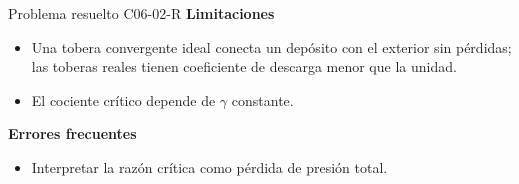 \documentclass[10pt,openany]{book}
\begin{document}
\begin{studiumworked}{Problema resuelto C06-02-R}
\noindent\textbf{Limitaciones}
\begin{itemize}
\item Una tobera convergente ideal conecta un depósito con el exterior sin pérdidas; las toberas reales tienen coeficiente de descarga menor que la unidad.
\item El cociente crítico depende de $\gamma$ constante.
\end{itemize}

\noindent\textbf{Errores frecuentes}
\begin{itemize}
\item Interpretar la razón crítica como pérdida de presión total.
\end{itemize}
\end{studiumworked}
\end{document}
